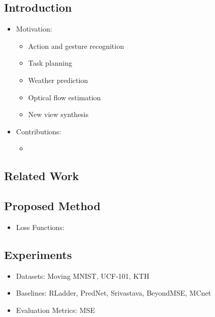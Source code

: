 \documentclass{article}
\begin{document}
    \subsection{Introduction}\label{subsec:Folded_Recurrent_Neural_Networks_for_Future_Video_Prediction_(FRNN):introduction}
    \begin{itemize}
        \item Motivation:
        \begin{itemize}
            \item Action and gesture recognition
            \item Task planning
            \item Weather prediction
            \item Optical flow estimation
            \item New view synthesis
        \end{itemize}
        \item Contributions:
        \begin{itemize}
            \item
        \end{itemize}
    \end{itemize}

    \subsection{Related Work}\label{subsec:Folded_Recurrent_Neural_Networks_for_Future_Video_Prediction_(FRNN):related-work}

    \subsection{Proposed Method}\label{subsec:Folded_Recurrent_Neural_Networks_for_Future_Video_Prediction_(FRNN):proposed-method}
    \begin{itemize}
        \item Loss Functions:
    \end{itemize}

    \subsection{Experiments}\label{subsec:Folded_Recurrent_Neural_Networks_for_Future_Video_Prediction_(FRNN):experiments}
    \begin{itemize}
        \item Datasets: Moving MNIST, UCF-101, KTH
        \item Baselines: RLadder, PredNet, Srivastava, BeyondMSE, MCnet
        \item Evaluation Metrics: MSE
    \end{itemize}
    \newpage
\end{document}
